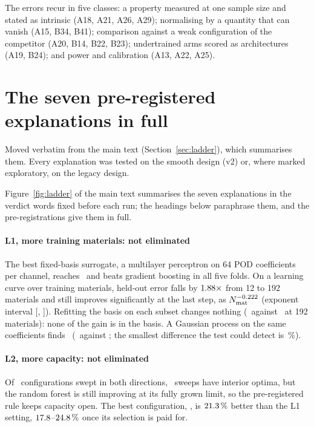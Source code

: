 The errors recur in five classes: a property measured at one sample size and stated as
intrinsic (A18, A21, A26, A29); normalising by a quantity that can vanish (A15, B34,
B41); comparison against a weak configuration of the competitor (A20, B14, B22, B23);
undertrained arms scored as architectures (A19, B24); and power and calibration (A13,
A22, A25).




\section{The seven pre-registered explanations in full}
\label{s2:sec:ladder}

Moved verbatim from the main text (Section~\ref{sec:ladder}), which summarises them. Every
explanation was tested on the smooth design (v2) or, where marked exploratory, on the
legacy design.

Figure~\ref{fig:ladder} of the main text summarises the seven explanations in the verdict words fixed
before each run; the headings below paraphrase them, and the pre-registrations give them in full.

\paragraph{L1, more training materials: not eliminated} The best fixed-basis surrogate, a
multilayer perceptron on 64 POD coefficients per channel, reaches \nLoneMLP\ and beats
gradient boosting in all five folds. On a learning curve over training materials, held-out
error falls by \(1.88\times\) from 12 to 192 materials and still improves
significantly at the last step, as \(N_{\mathrm{mat}}^{-0.222}\) (exponent interval
[\nLCbetaLo, \nLCbetaHi]). Refitting the basis on each subset changes nothing
(\nLClargestFixed\ against \nLClargest\ at 192 materials): none of the gain is in the
basis. A Gaussian process on the same coefficients finds \nBgpVerdict\ (\nBgpGp\ against
\nBgpMlp; the smallest difference the test could detect is \nBgpMde\,\%).

\paragraph{L2, more capacity: not eliminated} Of \nLtwoNconfigs\ configurations swept in both
directions, \nLtwoNUshaped\ sweeps have interior optima, but the random forest is still
improving at its fully grown limit, so the pre-registered rule keeps capacity open. The
best configuration, \nLtwoBestName, is \(21.3\,\%\) better than the L1 setting,
\(17.8\)--\(24.8\,\%\) once its selection is paid for.


